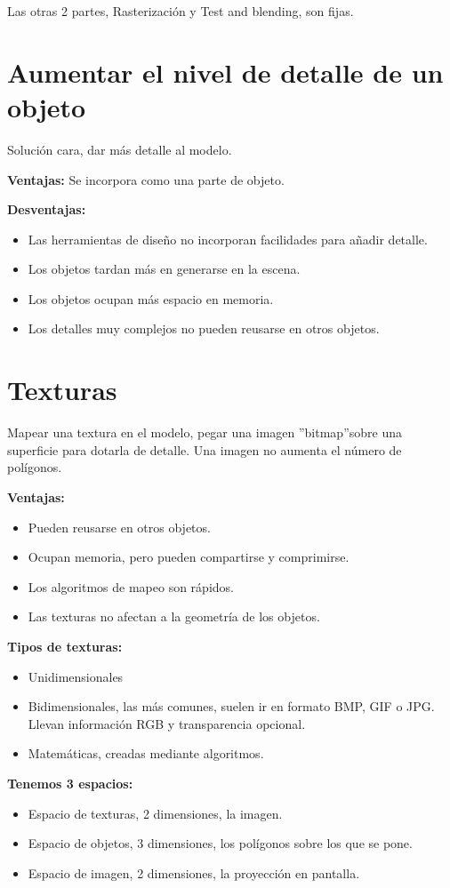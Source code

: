 Las otras 2 partes, Rasterización y Test and blending, son fijas.

\section{Aumentar el nivel de detalle de un objeto}
Solución cara, dar más detalle al modelo.

\textbf{Ventajas:} Se incorpora como una parte de objeto.

\textbf{Desventajas:}
\begin{itemize}
    \item Las herramientas de diseño no incorporan facilidades para añadir detalle.
    \item Los objetos tardan más en generarse en la escena.
    \item Los objetos ocupan más espacio en memoria.
    \item Los detalles muy complejos no pueden reusarse en otros objetos.
\end{itemize}

\section{Texturas}

Mapear una textura en el modelo, pegar una imagen ''bitmap''sobre una superficie para dotarla de detalle. Una imagen no aumenta el número de polígonos.

\textbf{Ventajas:}
\begin{itemize}
    \item Pueden reusarse en otros objetos.
    \item Ocupan memoria, pero pueden compartirse y comprimirse.
    \item Los algoritmos de mapeo son rápidos.
    \item Las texturas no afectan a la geometría de los objetos.
\end{itemize}

\textbf{Tipos de texturas:}
\begin{itemize}
    \item Unidimensionales
    \item Bidimensionales, las más comunes, suelen ir en formato BMP, GIF o JPG. Llevan información RGB y transparencia opcional.
    \item Matemáticas, creadas mediante algoritmos.
\end{itemize}

\textbf{Tenemos 3 espacios:}
\begin{itemize}
    \item Espacio de texturas, 2 dimensiones, la imagen.
    \item Espacio de objetos, 3 dimensiones, los polígonos sobre los que se pone.
    \item Espacio de imagen, 2 dimensiones, la proyección en pantalla.
\end{itemize}

